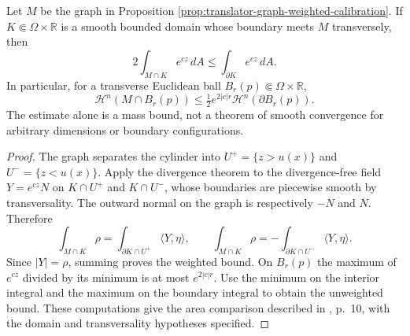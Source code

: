 \begin{proposition}\label{prop:translator-graph-local-area-bound}
Let $M$ be the graph in Proposition \ref{prop:translator-graph-weighted-calibration}. If $K\Subset\Omega\times\mathbb R$ is a smooth bounded domain whose boundary meets $M$ transversely, then
\[
 2\int_{M\cap K}e^{cz}\,dA\le\int_{\partial K}e^{cz}\,dA.
\]
In particular, for a transverse Euclidean ball $B_r(p)\Subset\Omega\times\mathbb R$,
\[
 \mathcal H^n(M\cap B_r(p))
 \le\tfrac12 e^{2|c|r}\mathcal H^n(\partial B_r(p)).
\]
The estimate alone is a mass bound, not a theorem of smooth convergence for arbitrary dimensions or boundary configurations.
\end{proposition}
\begin{proof}
The graph separates the cylinder into $U^+=\{z>u(x)\}$ and $U^-=\{z<u(x)\}$. Apply the divergence theorem to the divergence-free field $Y=e^{cz}N$ on $K\cap U^+$ and $K\cap U^-$, whose boundaries are piecewise smooth by transversality. The outward normal on the graph is respectively $-N$ and $N$. Therefore
\[
 \int_{M\cap K}\rho=\int_{\partial K\cap U^+}\langle Y,\eta\rangle,
 \qquad
 \int_{M\cap K}\rho=-\int_{\partial K\cap U^-}\langle Y,\eta\rangle.
\]
Since $|Y|=\rho$, summing proves the weighted bound. On $B_r(p)$ the maximum of $e^{cz}$ divided by its minimum is at most $e^{2|c|r}$. Use the minimum on the interior integral and the maximum on the boundary integral to obtain the unweighted bound. These computations give the area comparison described in \cite{HIMW19}, p.~10, with the domain and transversality hypotheses specified.
\end{proof}
